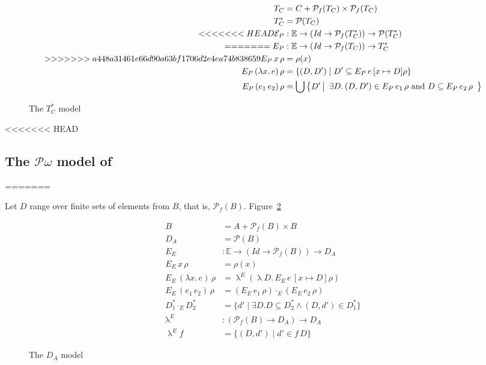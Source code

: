 \documentclass{tufte-handout}
\newcommand{\LAM}[1]{\lambda #1.\,}
\begin{document}
  \begin{figure}
\begin{align*}
  T_C &= C + \mathcal{P}_f(T_C) \times \mathcal{P}_f(T_C) \\
  T^{*}_C &= \mathcal{P}(T_C) \\
<<<<<<< HEAD
\EP &: \mathbb{E} \to (\mathit{Id}\to\mathcal{P}_f(T^{*}_C)) \to \mathcal{P}(T^{*}_C)\\
=======
E_{P}&: \mathbb{E} \to (\mathit{Id}\to\mathcal{P}_f(T_C)) \to T^{*}_C\\
>>>>>>> a448a31461e66d90a63bf1706d2e4ea74b838659
\PSEM{ x }\rho &= \rho(x) \\
\PSEM{ (\LAM{x} e) }\rho &= 
  \{ (D,D') \mid  D' \subseteq \PSEM{ e }[x\mapsto D]\rho \} \\
\PSEM{ (e_1\,e_2) }\rho &= \bigcup \left\{ D' \, \middle| 
   \begin{array}{l}
   \exists D.\, (D,D') \in \PSEM{ e_1 }\rho \text{ and } D \subseteq \PSEM{ e_2 }\rho 
   \end{array}
\right\} 
\end{align*}
\caption{The $T^{*}_C$ model}
\label{fig:t-c}
\end{figure}


<<<<<<< HEAD

\subsection{The $\mathcal{P}\omega$ model of \citet{Scott:1976lq}}
\label{sec:p-omega}
=======
\newcommand{\ESEM}[1]{E_E\, #1 \,}

  Let $D$ range over finite sets of elements from $B$, that is,
  $\mathcal{P}_f(B)$.  Figure~\ref{fig:d-a}

\begin{figure}
\begin{align*}
  B &= A + \mathcal{P}_f(B) \times B \\
  D_A &= \mathcal{P}(B) \\
E_{E}&: \mathbb{E} \to (\mathit{Id}\to\mathcal{P}_f(B)) \to D_A\\
\ESEM{ x }\rho &= \rho(x) \\
\ESEM{ (\LAM{x} e) }\rho &= \uplambda^E (\uplambda D.\, \ESEM{e}[x\mapsto D]\rho)\\
\ESEM{ (e_1\,e_2) }\rho &= (\ESEM{ e_1 }\rho) \cdot_E (\ESEM{ e_2 }\rho) \\[1ex]
   D^{*}_1 \cdot_E D^{*}_2 &= \{ d' \mid \exists D. D \subseteq D^{*}_2 \land (D,d') \in D^{*}_1 \} \\[1ex]
   \uplambda^E &: (\mathcal{P}_f(B) \to D_A) \to D_A \\
   \uplambda^E f &= \{ (D,d') \mid d' \in f\, D \} 
\end{align*}
\caption{The $D_A$ model}
\label{fig:d-a}
\end{figure}
\end{document}
